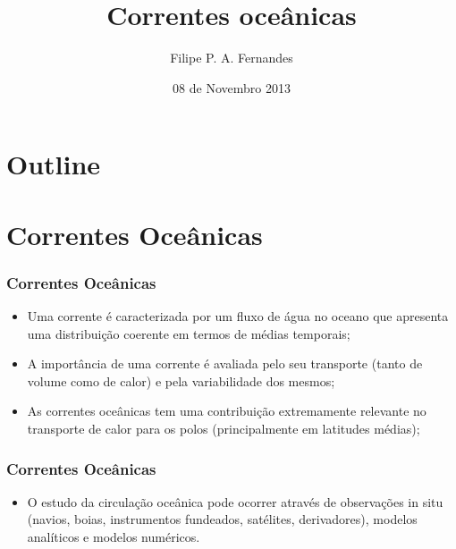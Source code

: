 \title[Aula 10]{Correntes oceânicas}
\author[Filipe Fernandes]{Filipe P. A. Fernandes}
\date[Novembro 2013]{08 de Novembro 2013}




\begin{frame}[plain]
  \titlepage
\end{frame}

\section*{Outline}
\begin{frame}
\tableofcontents
\end{frame}

\section{Correntes Oceânicas}
\begin{frame}
\frametitle{Correntes Oceânicas}
  \begin{itemize}[<+-| alert@+>]
    \item Uma corrente é caracterizada por um fluxo de água no oceano que
          apresenta uma distribuição coerente em termos de médias temporais;
    \item A importância de uma corrente é avaliada pelo seu transporte (tanto
          de volume como de calor) e pela variabilidade dos mesmos;
    \item As correntes oceânicas tem uma contribuição extremamente relevante no
          transporte de calor para os polos (principalmente em latitudes médias);
  \end{itemize}
\end{frame}


\begin{frame}
\frametitle{Correntes Oceânicas}
  \begin{itemize}[<+-| alert@+>]
    \item O estudo da circulação oceânica pode ocorrer através de observações
          in situ (navios, boias, instrumentos fundeados, satélites,
          derivadores), modelos analíticos e modelos numéricos.
  \end{itemize}
\end{frame}


